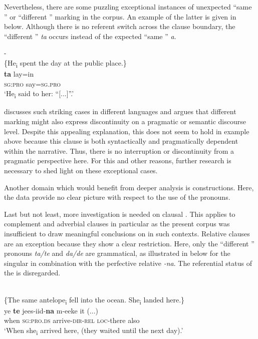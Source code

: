 \documentclass[output=paper
,newtxmath
,modfonts
,nonflat]{langsci/langscibook}
\begin{document}
Nevertheless, there are some puzzling exceptional instances of unexpected “same ” or “different ” marking in the corpus. An example of the latter is given in  below. Although there is no referent switch across the clause boundary, the “different ”  \textit{ta} occurs instead of the expected “same ”  \textit{a}.

\ea\label{ex:apel:23}
{- \citep[284]{Faye1979}}\\
{\-\hspace{0.5cm}\{He\textsubscript{i} spent the day at the public place.\}}\\
\gll   \textbf{ta} lay=in\\
     \textsc{sg:pro} say\textsc{=sg.pro} \\
\glt ‘He\textsubscript{i} said to her: “[...]”.’
\z

\citet[98-114]{Stirling1993} discusses such striking cases in different languages and argues that different  marking might also express discontinuity on a pragmatic or semantic discourse level. Despite this appealing explanation, this does not seem to hold in example  above because this clause is both syntactically and pragmatically dependent within the narrative. Thus, there is no interruption or discontinuity from a pragmatic perspective here. For this and other reasons, further research is necessary to shed light on these exceptional cases.

Another domain which would benefit from deeper analysis is  constructions. Here, the data provide no clear picture with respect to the use of the  pronouns.

Last but not least, more investigation is needed on clausal . This applies to complement and adverbial clauses in particular as the present corpus was insufficient to draw meaningful conclusions on  in such contexts. Relative clauses are an exception because they show a clear restriction. Here, only the “different ” pronouns \textit{ta/te} and \textit{da/de} are grammatical, as illustrated in  below for the singular in combination with the perfective relative \textit{-na}. The referential status of the  is disregarded.

\ea\label{ex:apel:24}
{  \citep[350]{Renaudier2012}}\\
{\-\hspace{0.5cm}\{The same antelope\textsubscript{i} fell into the ocean. She\textsubscript{i} landed here.\}} \\
\gll   ye \textbf{te} jees-iid-\textbf{na} m-eeke it (...)\\
     when \textsc{sg:pro.ds} arrive\textsc{-dir-rel} \textsc{loc-}there also \\
\glt ‘When she\textsubscript{i} arrived here, (they waited until the next day).’
\z
\end{document}

